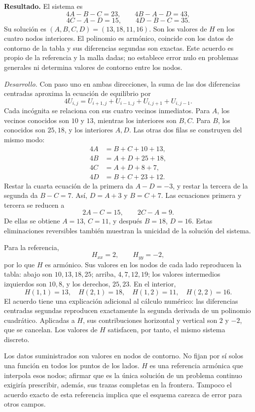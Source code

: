 \noindent\textbf{Resultado.} El sistema es
\[
4A-B-C=23,\qquad 4B-A-D=43,
\]
\[
4C-A-D=15,\qquad 4D-B-C=35.
\]
Su solución es \((A,B,C,D)=(13,18,11,16)\). Son los valores de \(H\) en los cuatro nodos interiores. El polinomio es armónico, coincide con los datos de contorno de la tabla y sus diferencias segundas son exactas. Este acuerdo es propio de la referencia y la malla dadas; no establece error nulo en problemas generales ni determina valores de contorno entre los nodos.

\noindent\textit{Desarrollo.} Con paso uno en ambas direcciones, la suma de las dos diferencias centradas aproxima la ecuación de equilibrio por
\[
4U_{i,j}=U_{i+1,j}+U_{i-1,j}+U_{i,j+1}+U_{i,j-1}.
\]
Cada incógnita se relaciona con sus cuatro vecinos inmediatos. Para \(A\), los vecinos conocidos son \(10\) y \(13\), mientras los interiores son \(B,C\). Para \(B\), los conocidos son \(25,18\), y los interiores \(A,D\). Las otras dos filas se construyen del mismo modo:
\[
\begin{aligned}
4A&=B+C+10+13,\\
4B&=A+D+25+18,\\
4C&=A+D+8+7,\\
4D&=B+C+23+12.
\end{aligned}
\]
Restar la cuarta ecuación de la primera da \(A-D=-3\), y restar la tercera de la segunda da \(B-C=7\). Así, \(D=A+3\) y \(B=C+7\). Las ecuaciones primera y tercera se reducen a
\[
2A-C=15,\qquad 2C-A=9.
\]
De ellas se obtiene \(A=13\), \(C=11\), y después \(B=18\), \(D=16\). Estas eliminaciones reversibles también muestran la unicidad de la solución del sistema.

Para la referencia,
\[
H_{xx}=2,\qquad H_{yy}=-2,
\]
por lo que \(H\) es armónico. Sus valores en los nodos de cada lado reproducen la tabla: abajo son \(10,13,18,25\); arriba, \(4,7,12,19\); los valores intermedios izquierdos son \(10,8\), y los derechos, \(25,23\). En el interior,
\[
H(1,1)=13,\quad H(2,1)=18,\quad H(1,2)=11,\quad H(2,2)=16.
\]
El acuerdo tiene una explicación adicional al cálculo numérico: las diferencias centradas segundas reproducen exactamente la segunda derivada de un polinomio cuadrático. Aplicadas a \(H\), sus contribuciones horizontal y vertical son \(2\) y \(-2\), que se cancelan. Los valores de \(H\) satisfacen, por tanto, el mismo sistema discreto.

Los datos suministrados son valores en nodos de contorno. No fijan por sí solos una función en todos los puntos de los lados. \(H\) es una referencia armónica que interpola esos nodos; afirmar que es la única solución de un problema continuo exigiría prescribir, además, sus trazas completas en la frontera. Tampoco el acuerdo exacto de esta referencia implica que el esquema carezca de error para otros campos.

